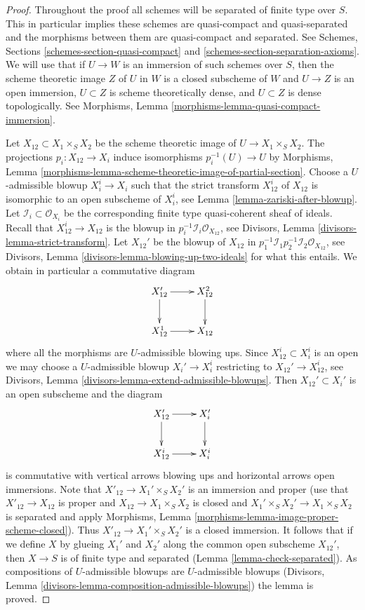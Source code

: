 \documentclass[10pt,a4paper]{amsart}
\theoremstyle{plain}
\theoremstyle{definition}
\theoremstyle{remark}
\numberwithin{equation}{subsection}
\begin{document}
\begin{proof}
Throughout the proof all schemes will be separated of finite type over $S$.
This in particular implies these schemes are quasi-compact and quasi-separated
and the morphisms between them are quasi-compact and separated.
See Schemes, Sections \ref{schemes-section-quasi-compact} and
\ref{schemes-section-separation-axioms}.
We will use that if $U \to W$ is an immersion of such schemes over $S$,
then the scheme theoretic image $Z$ of $U$ in $W$ is a closed subscheme
of $W$ and $U \to Z$ is an open immersion, $U \subset Z$ is scheme
theoretically dense, and $U \subset Z$ is dense topologically. See
Morphisms, Lemma
\ref{morphisms-lemma-quasi-compact-immersion}.

\medskip\noindent
Let $X_{12} \subset X_1 \times_S X_2$ be the scheme theoretic image
of $U \to X_1 \times_S X_2$. The projections $p_i : X_{12} \to X_i$
induce isomorphisms $p_i^{-1}(U) \to U$ by
Morphisms, Lemma
\ref{morphisms-lemma-scheme-theoretic-image-of-partial-section}.
Choose a $U$-admissible blowup $X_i^i \to X_i$ such that
the strict transform $X_{12}^i$ of $X_{12}$ is isomorphic to an
open subscheme of $X_i^i$, see
Lemma \ref{lemma-zariski-after-blowup}.
Let $\mathcal{I}_i \subset \mathcal{O}_{X_i}$ be the corresponding
finite type quasi-coherent sheaf of ideals.
Recall that $X_{12}^i \to X_{12}$ is the blowup in
$p_i^{-1}\mathcal{I}_i \mathcal{O}_{X_{12}}$, see
Divisors, Lemma \ref{divisors-lemma-strict-transform}.
Let $X_{12}'$ be the blowup of $X_{12}$ in
$p_1^{-1}\mathcal{I}_1 p_2^{-1}\mathcal{I}_2 \mathcal{O}_{X_{12}}$, see
Divisors, Lemma \ref{divisors-lemma-blowing-up-two-ideals}
for what this entails. We obtain in particular a commutative diagram
$$
\xymatrix{
X_{12}' \ar[d] \ar[r] & X_{12}^2 \ar[d] \\
X_{12}^1 \ar[r] & X_{12}
}
$$
where all the morphisms are $U$-admissible blowing ups.
Since $X_{12}^i \subset X_i^i$ is an open we may choose a $U$-admissible blowup
$X_i' \to X_i^i$ restricting to $X_{12}' \to X_{12}^i$, see
Divisors, Lemma \ref{divisors-lemma-extend-admissible-blowups}.
Then $X_{12}' \subset X_i'$ is an open subscheme and the diagram
$$
\xymatrix{
X_{12}' \ar[d] \ar[r] & X_i' \ar[d] \\
X_{12}^i \ar[r] & X_i^i
}
$$
is commutative with vertical arrows blowing ups and horizontal arrows
open immersions. Note that $X'_{12} \to X_1' \times_S X_2'$ is
an immersion and proper (use that $X'_{12} \to X_{12}$ is proper
and $X_{12} \to X_1 \times_S X_2$ is closed and $X_1' \times_S X_2' \to
X_1 \times_S X_2$ is separated and apply Morphisms, Lemma
\ref{morphisms-lemma-image-proper-scheme-closed}).
Thus $X'_{12} \to  X_1' \times_S X_2'$ is a closed immersion.
It follows that if we define $X$ by glueing $X_1'$ and $X_2'$
along the common open subscheme $X_{12}'$, then $X \to S$ is of finite type
and separated (Lemma \ref{lemma-check-separated}).
As compositions of $U$-admissible blowups are $U$-admissible blowups
(Divisors, Lemma \ref{divisors-lemma-composition-admissible-blowups})
the lemma is proved.
\end{proof}
\end{document}
